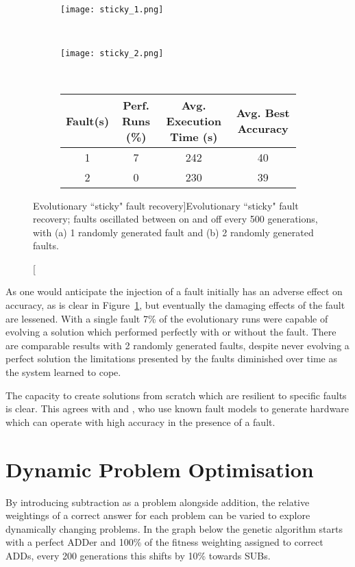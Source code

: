 \begin{figure}
	\centering
	\begin{subfigure}[ht]{0.49\textwidth}
		\texttt{[image: sticky\_1.png]}
		\caption{}
		\vspace{1em}
	\end{subfigure}
	~
	\begin{subfigure}[ht]{0.49\textwidth}
		\texttt{[image: sticky\_2.png]}
		\caption{}
		\vspace{1em}
	\end{subfigure}
	~
	\begin{subfigure}[ht]{\textwidth}
		\centering
		\begin{tabular}{cccc}
			\toprule
			\bfseries{Fault(s)} & \bfseries{Perf. Runs (\%)} &
			\bfseries{Avg. Execution Time (s)} & \bfseries{Avg. Best Accuracy}\\
			\midrule
			1 & 7 & 242 & 40 \\
			2 & 0 & 230 & 39 \\
			\bottomrule
		\end{tabular}
	\end{subfigure}
	\caption[Evolutionary ``sticky" fault recovery]{Evolutionary ``sticky"
		fault recovery; faults oscillated between on and off every 500
		generations, with
		(a) 1 randomly generated fault and (b) 2 randomly generated
	faults.}
	\label{fig:sticky}
\end{figure}

As one would anticipate the injection of a fault initially has an adverse effect on
accuracy, as is clear in Figure~\ref{fig:sticky}, but eventually the damaging effects
of the fault are lessened. With a single fault 7\% of the evolutionary runs
were capable of evolving a solution which performed perfectly with or without
the fault. There are comparable results with 2 randomly generated faults, despite
never evolving a perfect solution the limitations presented by the faults diminished
over time as the system learned to cope.

The capacity to create solutions from scratch which are resilient to specific faults
is clear. This agrees with \cite{651463} and \cite{Keymeulen2000},
who use known fault models to generate
hardware which can operate with high accuracy in the presence of a fault.

\section{Dynamic Problem Optimisation}
By introducing subtraction as a problem alongside addition, the relative weightings of a correct answer for each problem can be varied to explore dynamically changing problems. In the graph below the genetic algorithm starts with a perfect ADDer and 100\% of the fitness weighting assigned to correct ADDs, every 200 generations this shifts by 10\% towards SUBs.

